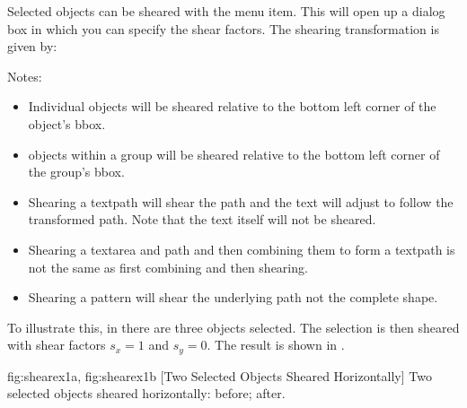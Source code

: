 
Selected \glspl{object} can be sheared with
the  menu item. This will open up a dialog box
in which you can specify the shear factors. The shearing
transformation is given by:
\TeXParserLibToImage
[div=displaymath,alt={
 (
   [ 1 , sX ]
   [ sY , 1 ]
 )
 (
   [ x ]
   [ y ]
 )
=
 (
   [ x + sX \texttimes\ y ]
   [ y + sY \texttimes\ x ]
 )
}]
{
\[
  \left(
  \begin{array}{cc}
  1 & s_x\\
  s_y & 1
  \end{array}
  \right)
  \left(
  \begin{array}{c}
  x\\
  y
  \end{array}
  \right)
  =
  \left(
  \begin{array}{l}
  x + s_x y\\
  y + s_y x
  \end{array}
  \right)
  \]
}

Notes:
\begin{itemize}
\item Individual \glspl*{object}
will be sheared relative to the bottom left corner of the
object's \gls{bbox}.

\item \Glspl*{object} within a 
\gls{group} will be sheared relative to the bottom
left corner of the group's \gls*{bbox}.

\item Shearing a \gls{textpath} will shear the path and the text
will adjust to follow the transformed path. Note that the text
itself will not be sheared.

\item Shearing a \gls*{textarea} and \gls*{path} and then combining
them to form a \gls*{textpath} is not the same as first combining
and then shearing. 

\item Shearing a \gls{pattern} will shear the underlying path not
the complete shape.
\end{itemize}

To illustrate this, in  there are three
\glspl*{object} selected.  The selection is then sheared with shear
factors $s_x=1$ and $s_y=0$.  The result is shown in
.

{
 {fig:shearex1a}{}{},
 {fig:shearex1b}{}{}
}
[Two Selected Objects Sheared Horizontally]
{Two selected objects sheared horizontally:
 before;
 after.}

